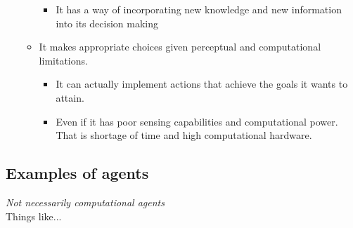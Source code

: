 \documentclass[12pt]{article}
\begin{document}
\begin{itemize}
\begin{itemize}
        \begin{itemize}
            \item It has a way of incorporating new knowledge and new information into its decision making 
        \end{itemize}
        \item It makes appropriate choices given perceptual and computational limitations.
        \begin{itemize}
            \item It can actually implement actions that achieve the goals it wants to attain. 
            \item Even if it has poor sensing capabilities and computational power. That is shortage of time and high computational hardware.
        \end{itemize}
    \end{itemize}
\end{itemize}


\subsection*{Examples of agents}

\emph{Not necessarily computational agents}\\

\noindent Things like...
\end{document}
